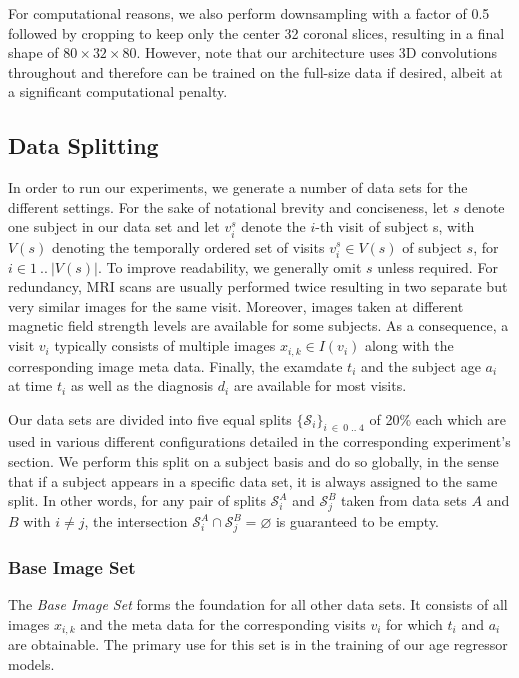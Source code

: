 For computational reasons, we also perform downsampling with a factor of 0.5 followed by cropping to keep only the center 32 coronal slices, resulting in a final shape of $ 80 \times 32 \times 80 $. However, note that our architecture uses 3D convolutions throughout and therefore can be trained on the full-size data if desired, albeit at a significant computational penalty.

\subsection{Data Splitting} \label{sec:dat}
In order to run our experiments, we generate a number of data sets for the different settings. For the sake of notational brevity and conciseness, let $s$ denote one subject in our data set and let $v^s_i$ denote the $i$-th visit of subject s, with $V(s)$ denoting the temporally ordered set of visits $v^s_i \in V(s)$ of subject $s$, for $i \in 1 \ ..\ |V(s)|$. To improve readability, we generally omit $s$ unless required. For redundancy, MRI scans are usually performed twice resulting in two separate but very similar images for the same visit. Moreover, images taken at different magnetic field strength levels are available for some subjects. As a consequence, a visit $v_i$ typically consists of multiple images $x_{i, k} \in I(v_i)$ along with the corresponding image meta data. Finally, the examdate $t_i$ and the subject age $a_i$ at time $t_i$ as well as the diagnosis $d_i$ are available for most visits.

Our data sets are divided into five equal splits $ \{ \mathcal{S}_i \}_{i\ \in\ 0\;..\;4} $ of 20\% each which are used in various different configurations detailed in the corresponding experiment's section. We perform this split on a subject basis and do so globally, in the sense that if a subject appears in a specific data set, it is always assigned to the same split. In other words, for any pair of splits $ \mathcal{S}_i^A $ and $ \mathcal{S}_j^B $ taken from data sets $A$ and $B$ with $ i \neq j $, the intersection $ { \mathcal{S}_i^A \cap \mathcal{S}_j^B = \varnothing } $ is guaranteed to be empty.

\subsubsection*{Base Image Set} \label{sec:datsingles}
The \textit{Base Image Set} forms the foundation for all other data sets. It consists of all images $x_{i, k}$ and the meta data for the corresponding visits $v_i$ for which $t_i$ and $a_i$ are obtainable. The primary use for this set is in the training of our age regressor models.

